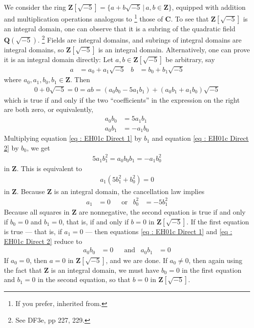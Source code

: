 \documentclass[oneside, english, 11pt]{article}
\newcommand{\C}{\complexes}
\newcommand{\complexes}{\mathbf{C}}
\newcommand{\integers}{\mathbf{Z}}
\newcommand{\Q}{\rationals}
\newcommand{\rationals}{\mathbf{Q}}
\newcommand{\st}{\,|\,}
\newcommand{\Z}{\integers}
\begin{document}
{We consider the ring $\Z[\sqrt{-5}] = \{a + b \sqrt{-5} \st a, b \in \Z\}$, equipped with addition and multiplication operations analogous to%
\footnote{If you prefer, inherited from.} %
those of $\C$. To see that $\Z[\sqrt{-5}]$ is an integral domain, one can observe that it is a subring of the quadratic field $\Q(\sqrt{-5})$.%
\footnote{See DF3e, pp 227, 229.} %
Fields are integral domains, and subrings of integral domains are integral domains, so $\Z[\sqrt{-5}]$ is an integral domain. Alternatively, one can prove it is an integral domain directly: Let $a,b \in \Z[\sqrt{-5}]$ be arbitrary, say
\begin{align*}
a
&=
a_{0} + a_{1} \sqrt{-5}
&
b
&=
b_{0} + b_{1} \sqrt{-5}
\end{align*}
where $a_{0}, a_{1}, b_{0}, b_{1} \in \Z$. Then
\begin{align*}
0 + 0 \sqrt{-5}
=
0
=
a b
= (a_{0} b_{0} - 5 a_{1} b_{1}) + (a_{0} b_{1} + a_{1} b_{0}) \sqrt{-5}
\end{align*}
which is true if and only if the two ``coefficients'' in the expression on the right are both zero, or equivalently,
\begin{align}
a_{0} b_{0}
&=
5 a_{1} b_{1}%
\label{eq : EH01c Direct 1}
\\
a_{0} b_{1}
&=
-a_{1} b_{0}%
\label{eq : EH01c Direct 2}
\end{align}
Multiplying equation \eqref{eq : EH01c Direct 1} by $b_{1}$ and equation \eqref{eq : EH01c Direct 2} by $b_{0}$, we get
\begin{align*}
5 a_{1} b_{1}^{2}
=
a_{0} b_{0} b_{1}
=
-a_{1} b_{0}^{2}
\end{align*}
in $\Z$. This is equivalent to
\begin{align*}
a_{1} (5 b_{1}^{2} + b_{0}^{2})
=
0
\end{align*}
in $\Z$. Because $\Z$ is an integral domain, the cancellation law implies
\begin{align*}
a_{1}
&=
0
&
&\text{or}
&
b_{0}^{2}
&=
-5 b_{1}^{2}
\end{align*}
Because all squares in $\Z$ are nonnegative, the second equation is true if and only if $b_{0} = 0$ and $b_{1} = 0$, that is, if and only if $b = 0$ in $\Z[\sqrt{-5}]$. If the first equation is true --- that is, if $a_{1} = 0$ --- then equations \eqref{eq : EH01c Direct 1} and \eqref{eq : EH01c Direct 2} reduce to
\begin{align*}
a_{0} b_{0}
&=
0
&
&\text{and}
&
a_{0} b_{1}
&=
0
\end{align*}
If $a_{0} = 0$, then $a = 0$ in $\Z[\sqrt{-5}]$, and we are done. If $a_{0} \neq 0$, then again using the fact that $\Z$ is an integral domain, we must have $b_{0} = 0$ in the first equation and $b_{1} = 0$ in the second equation, so that $b = 0$ in $\Z[\sqrt{-5}]$.

}
\end{document}
